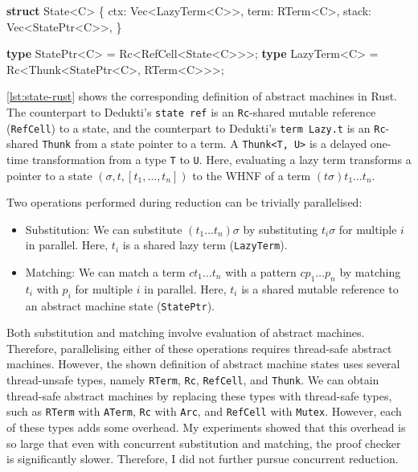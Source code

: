\documentclass[screen,sigplan,10pt]{acmart}
\newenvironment{Shaded}{}{}
\newcommand{\DataTypeTok}[1]{\textcolor[rgb]{0.56,0.13,0.00}{#1}}
\newcommand{\KeywordTok}[1]{\textcolor[rgb]{0.00,0.44,0.13}{\textbf{#1}}}
\newcommand{\NormalTok}[1]{#1}
\newcommand{\OperatorTok}[1]{\textcolor[rgb]{0.40,0.40,0.40}{#1}}
\providecommand{\tightlist}{}
\begin{document}
\begin{listing}\begin{Shaded}
\begin{Highlighting}[]
\KeywordTok{struct}\NormalTok{ State<C> }\OperatorTok{\{}
\NormalTok{    ctx: }\DataTypeTok{Vec}\NormalTok{<LazyTerm<C>>,}
\NormalTok{    term: RTerm<C>,}
\NormalTok{    stack: }\DataTypeTok{Vec}\NormalTok{<StatePtr<C>>,}
\OperatorTok{\}}

\KeywordTok{type}\NormalTok{ StatePtr<C> = Rc<RefCell<State<C>>>;}
\KeywordTok{type}\NormalTok{ LazyTerm<C> =}
\NormalTok{    Rc<Thunk<StatePtr<C>, RTerm<C>>>;}
\end{Highlighting}
\end{Shaded}


\caption{Abstract machine state in Rust.}

\hypertarget{lst:state-rust}{%
\label{lst:state-rust}}%
\end{listing}

\autoref{lst:state-rust} shows the corresponding definition of abstract
machines in Rust. The counterpart to Dedukti's \texttt{state\ ref} is an
\texttt{Rc}-shared mutable reference (\texttt{RefCell}) to a state, and
the counterpart to Dedukti's \texttt{term\ Lazy.t} is an
\texttt{Rc}-shared \texttt{Thunk} from a state pointer to a term. A
\texttt{Thunk\textless{}T,\ U\textgreater{}} is a delayed one-time
transformation from a type \texttt{T} to \texttt{U}. Here, evaluating a
lazy term transforms a pointer to a state
\((\sigma, t, [t_1, \dots, t_n])\) to the WHNF of a term
\((t \sigma) t_1 \dots t_n\).

Two operations performed during reduction can be trivially parallelised:

\begin{itemize}
\tightlist
\item
  Substitution: We can substitute \((t_1 \dots t_n) \sigma\) by
  substituting \(t_i \sigma\) for multiple \(i\) in parallel. Here,
  \(t_i\) is a shared lazy term (\texttt{LazyTerm}).
\item
  Matching: We can match a term \(c t_1 \dots t_n\) with a pattern
  \(c p_1 \dots p_n\) by matching \(t_i\) with \(p_i\) for multiple
  \(i\) in parallel. Here, \(t_i\) is a shared mutable reference to an
  abstract machine state (\texttt{StatePtr}).
\end{itemize}

Both substitution and matching involve evaluation of abstract machines.
Therefore, parallelising either of these operations requires thread-safe
abstract machines. However, the shown definition of abstract machine
states uses several thread-unsafe types, namely \texttt{RTerm},
\texttt{Rc}, \texttt{RefCell}, and \texttt{Thunk}. We can obtain
thread-safe abstract machines by replacing these types with thread-safe
types, such as \texttt{RTerm} with \texttt{ATerm}, \texttt{Rc} with
\texttt{Arc}, and \texttt{RefCell} with \texttt{Mutex}. However, each of
these types adds some overhead. My experiments showed that this overhead
is so large that even with concurrent substitution and matching, the
proof checker is significantly slower. Therefore, I did not further
pursue concurrent reduction.
\end{document}
